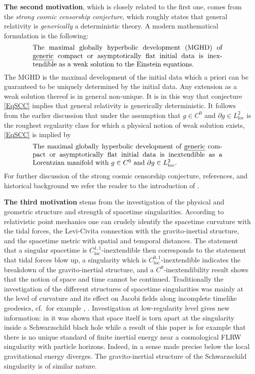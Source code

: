 \documentclass[reqno]{article}
\newcommand{\loc}{\mathrm{loc}}
\newcommand{\rd}{\partial}
\begin{document}
\textbf{The second motivation}, which is closely related to the first one, comes from the \emph{strong cosmic censorship conjecture}, which roughly states that general relativity is \emph{generically} a deterministic theory. A modern mathematical formulation is the following: 
\begin{equation} \label{EqSCC}
\parbox{0.8\textwidth}{The maximal globally hyperbolic development (MGHD) of \emph{generic} compact or asymptotically flat initial data is inextendible as a weak solution to the Einstein equations.}
\end{equation} 
The MGHD is the maximal development of the initial data which a priori can be guaranteed to be uniquely determined by the initial data. Any extension  as a weak solution thereof is in general non-unique. It is in this way that conjecture \eqref{EqSCC} implies that general relativity is generically deterministic. It follows from the earlier discussion that under the assumption that $g \in C^0$ and $\rd g \in L^2_{\loc}$ is the roughest regularity class for which a physical notion of weak solution exists, \eqref{EqSCC} is implied by 
\begin{equation*}
\parbox{0.8\textwidth}{The maximal globally hyperbolic development of \emph{generic} compact or asymptotically flat initial data is inextendible as a  Lorentzian manifold with $g \in C^0$ and $\rd g \in L^2_{\loc}$.}
\end{equation*} 
For further discussion of the strong cosmic censorship conjecture, references, and historical  background we refer the reader to the introduction of \cite{DafLuk17}.

\textbf{The third motivation} stems from the investigation of the physical and geometric structure and strength of spacetime singularities. According to relativistic point mechanics one can crudely identify the spacetime curvature with the tidal forces, the Levi-Civita connection with the gravito-inertial structure, and the spacetime metric with spatial and temporal distances. The statement that a singular spacetime is $C^{1,1}_{\loc}$-inextendible then corresponds to the statement that tidal forces blow up, a singularity which is $C^{0,1}_{\loc}$-inextendible indicates the breakdown of the gravito-inertial structure, and a $C^0$-inextendibility result shows that the notion of space and time cannot be continued. Traditionally the investigation of the different structures of spacetime singularities was mainly at the level of curvature and its effect on Jacobi fields along incomplete timelike geodesics, cf.\  for example \cite{Tip77}, \cite{Ori00}. Investigation at low-regularity level gives new information: in \cite{Sbie15} it was shown that space itself is torn apart at the singularity inside a Schwarzschild black hole while a result of this paper is for example that there is no unique standard of finite inertial energy near a cosmological FLRW singularity with particle horizons. Indeed, in a sense made precise below the local gravitational energy diverges. The gravito-inertial structure of the Schwarzschild singularity is of similar nature.
\end{document}
